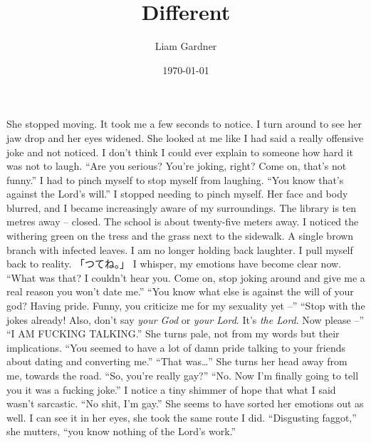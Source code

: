 \documentclass[a4paper, 12pt]{book}
\title{Different}
\author{Liam Gardner}
\date{\today}
\begin{document}
\newcommand\tab[1][1cm]{\hspace*{#1}}
\maketitle
\begin{CJK*}{UTF8}{min}
\tab
She stopped moving. It took me a few seconds to notice. I turn around to see her jaw drop and her eyes widened. She looked at me like I had said a really offensive joke and not noticed. I don’t think I could ever explain to someone how hard it was not to laugh. ``Are you serious? You’re joking, right? Come on, that’s not funny.'' I had to pinch myself to stop myself from laughing. ``You know that’s against the Lord’s will.'' I stopped needing to pinch myself. 
\newline
\tab
Her face and body blurred, and I became increasingly aware of my surroundings. The library is ten metres away -- closed. The school is about twenty-five meters away. I noticed the withering green on the tress and the grass next to the sidewalk. A single brown branch with infected leaves. I am no longer holding back laughter. I pull myself back to reality. 「つてね。」
I whisper, my emotions have become clear now.
\newline
\tab
``What was that? I couldn’t hear you. Come on, stop joking around and give me a real reason you won’t date me.''
\newline
\tab
``You know what else is against the will of your god? Having pride. Funny, you criticize me for my sexuality yet --''
\newline
\tab
``Stop with the jokes already! Also, don’t say \textit{your God} or \textit{your Lord}. It’s \textit{the Lord}. Now please --''
\newline
\tab
``I AM FUCKING TALKING.'' She turns pale, not from my words but their implications. ``You seemed to have a lot of damn pride talking to your friends about dating and converting me.''
\newline
\tab
``That was…'' She turns her head away from me, towards the road. ``So, you’re really gay?''
\newline
\tab
``No. Now I’m finally going to tell you it was a fucking joke.'' I notice a tiny shimmer of hope that what I said wasn’t sarcastic. ``No shit, I’m gay.''
\newline
\tab
She seems to have sorted her emotions out as well. I can see it in her eyes, she took the same route I did. ``Disgusting faggot,'' she mutters, ``you know nothing of the Lord’s work.''

\end{CJK*}
\end{document}
